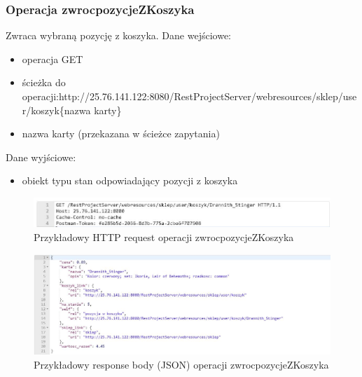 \documentclass[11pt]{article}   %
\begin{document}
\subsubsection{Operacja zwrocpozycjeZKoszyka}
Zwraca wybraną pozycję z koszyka. 
Dane wejściowe:
\begin{itemize}
	\item operacja GET
	\item ścieżka do operacji:\newline http://25.76.141.122:8080/RestProjectServer/webresources/sklep/user/koszyk\{nazwa karty\}
	\item nazwa karty (przekazana w ścieżce zapytania)
\end{itemize}	
Dane wyjściowe:
\begin{itemize}
	\item obiekt typu stan odpowiadający pozycji z koszyka
	
\end{itemize}
\begin{figure}[H]
	\centering
	\includegraphics[width=0.8\linewidth]{komunikaty_zdjecia_rest/zwrocpozycjeZKoszyka_req}
	\caption{Przykładowy HTTP request operacji zwrocpozycjeZKoszyka}
	\label{zrzut61}
\end{figure}
\begin{figure}[H]
	\centering
	\includegraphics[width=0.8\linewidth]{komunikaty_zdjecia_rest/zwrocpozycjeZKoszyka_res_body}
	\caption{Przykładowy response body (JSON) operacji zwrocpozycjeZKoszyka}
	\label{zrzut62}
\end{figure}
\end{document}

